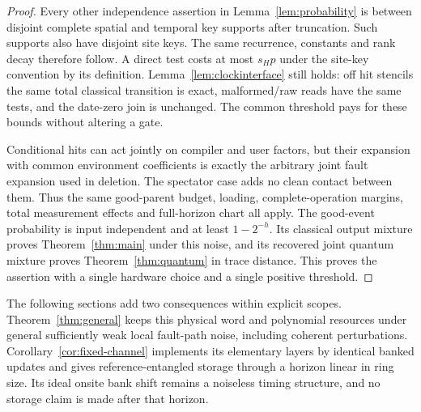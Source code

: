 \begin{proof}
Every other independence assertion in Lemma~\ref{lem:probability} is between disjoint complete spatial and temporal key supports after truncation. Such supports also have disjoint site keys. The same recurrence, constants and rank decay therefore follow. A direct test costs at most $s_Hp$ under the site-key convention by its definition. Lemma~\ref{lem:clockinterface} still holds: off hit stencils the same total classical transition is exact, malformed/raw reads have the same tests, and the date-zero join is unchanged. The common threshold pays for these bounds without altering a gate.

Conditional hits can act jointly on compiler and user factors, but their expansion with common environment coefficients is exactly the arbitrary joint fault expansion used in deletion. The spectator case adds no clean contact between them. Thus the same good-parent budget, loading, complete-operation margins, total measurement effects and full-horizon chart all apply. The good-event probability is input independent and at least $1-2^{-h}$. Its classical output mixture proves Theorem~\ref{thm:main} under this noise, and its recovered joint quantum mixture proves Theorem~\ref{thm:quantum} in trace distance. This proves the assertion with a single hardware choice and a single positive threshold.
\end{proof}

The following sections add two consequences within explicit scopes. Theorem~\ref{thm:general} keeps this physical word and polynomial resources under general sufficiently weak local fault-path noise, including coherent perturbations. Corollary~\ref{cor:fixed-channel} implements its elementary layers by identical banked updates and gives reference-entangled storage through a horizon linear in ring size. Its ideal onsite bank shift remains a noiseless timing structure, and no storage claim is made after that horizon.
